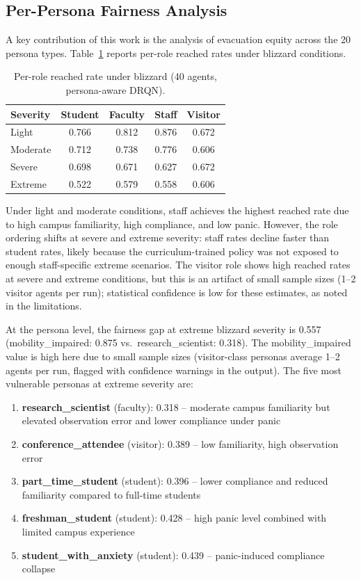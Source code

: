 \documentclass[11pt]{article}
\begin{document}
\subsection{Per-Persona Fairness Analysis}

A key contribution of this work is the analysis of evacuation equity across the 20 persona types. Table~\ref{tab:fairness} reports per-role reached rates under blizzard conditions.

\begin{table}[h]
\centering
\caption{Per-role reached rate under blizzard (40 agents, persona-aware DRQN).}
\label{tab:fairness}
\begin{tabular}{lcccc}
\toprule
\textbf{Severity} & \textbf{Student} & \textbf{Faculty} & \textbf{Staff} & \textbf{Visitor} \\
\midrule
Light    & 0.766 & 0.812 & 0.876 & 0.672 \\
Moderate & 0.712 & 0.738 & 0.776 & 0.606 \\
Severe   & 0.698 & 0.671 & 0.627 & 0.672 \\
Extreme  & 0.522 & 0.579 & 0.558 & 0.606 \\
\bottomrule
\end{tabular}
\end{table}

Under light and moderate conditions, staff achieves the highest reached rate due to high campus familiarity, high compliance, and low panic. However, the role ordering shifts at severe and extreme severity: staff rates decline faster than student rates, likely because the curriculum-trained policy was not exposed to enough staff-specific extreme scenarios. The visitor role shows high reached rates at severe and extreme conditions, but this is an artifact of small sample sizes (1--2 visitor agents per run); statistical confidence is low for these estimates, as noted in the limitations.

At the persona level, the fairness gap at extreme blizzard severity is 0.557 (mobility\_impaired: 0.875 vs.\ research\_scientist: 0.318). The mobility\_impaired value is high here due to small sample sizes (visitor-class personas average 1--2 agents per run, flagged with confidence warnings in the output). The five most vulnerable personas at extreme severity are:

\begin{enumerate}
  \item \textbf{research\_scientist} (faculty): 0.318 -- moderate campus familiarity but elevated observation error and lower compliance under panic
  \item \textbf{conference\_attendee} (visitor): 0.389 -- low familiarity, high observation error
  \item \textbf{part\_time\_student} (student): 0.396 -- lower compliance and reduced familiarity compared to full-time students
  \item \textbf{freshman\_student} (student): 0.428 -- high panic level combined with limited campus experience
  \item \textbf{student\_with\_anxiety} (student): 0.439 -- panic-induced compliance collapse
\end{enumerate}
\end{document}
